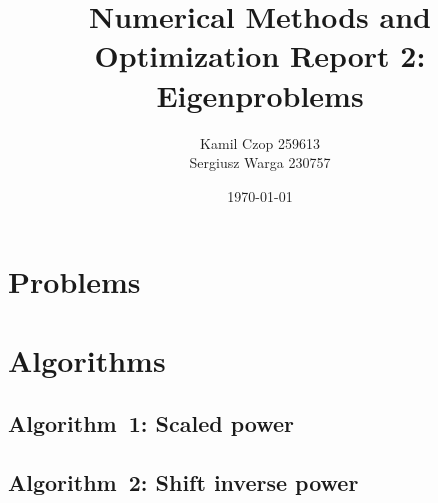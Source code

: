 \documentclass[a4paper]{article}
\title{Numerical Methods and Optimization Report 2: Eigenproblems}
\author{Kamil Czop 259613\\Sergiusz Warga 230757}
\date{\today}
\begin{document}
\maketitle
\tableofcontents
\pagebreak

\section{Problems}





\clearpage

\section{Algorithms}
\subsection{Algorithm~1: Scaled power}%
\label{algorithm:1}

\subsection{Algorithm~2: Shift inverse power}%
\label{algorithm:2}



\clearpage

\nocite{GoluVanl96,Zarowski,Zdunek}


\end{document}
